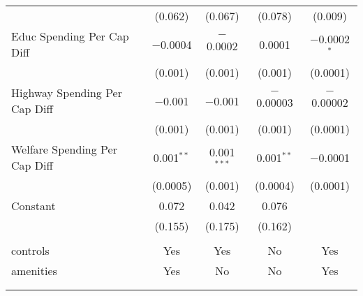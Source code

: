 \begin{table}[!htbp]
\begin{tabular}{@{\extracolsep{5pt}}lcccc}
  & (0.062) & (0.067) & (0.078) & (0.009) \\ 
  Educ Spending Per Cap Diff & $-$0.0004 & $-$0.0002 & 0.0001 & $-$0.0002$^{*}$ \\ 
  & (0.001) & (0.001) & (0.001) & (0.0001) \\ 
  Highway Spending Per Cap Diff & $-$0.001 & $-$0.001 & $-$0.00003 & $-$0.00002 \\ 
  & (0.001) & (0.001) & (0.001) & (0.0001) \\ 
  Welfare Spending Per Cap Diff & 0.001$^{**}$ & 0.001$^{***}$ & 0.001$^{**}$ & $-$0.0001 \\ 
  & (0.0005) & (0.001) & (0.0004) & (0.0001) \\ 
  Constant & 0.072 & 0.042 & 0.076 &  \\ 
  & (0.155) & (0.175) & (0.162) &  \\ 
 \hline \\[-1.8ex] 
controls & Yes & Yes & No & Yes \\ 
amenities & Yes & No & No & Yes \\ 
\hline \\[-1.8ex] 
\hline 
\hline \\[-1.8ex] 
\end{tabular} 
\end{table} 
